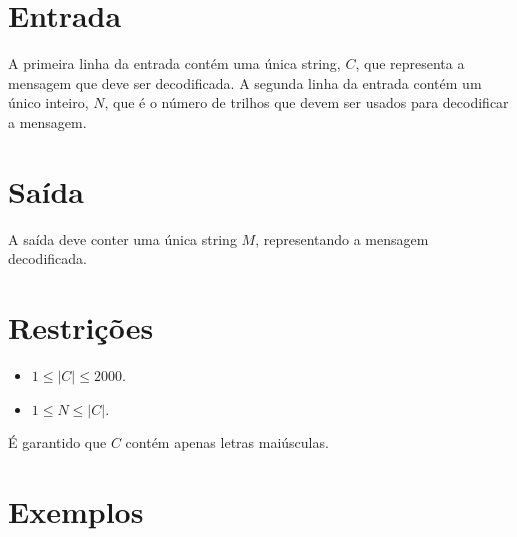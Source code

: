 \section*{Entrada}

A primeira linha da entrada contém uma única string, $C$, que representa a mensagem que deve ser decodificada. 
A segunda linha da entrada contém um único inteiro, $N$, que é o número de trilhos que devem ser usados para decodificar a mensagem.

\section*{Saída}

A saída deve conter uma única string $M$, representando a mensagem decodificada.

\section*{Restrições}

\begin{itemize}
\item $1 \leq |C| \leq 2000$.
\item $1 \leq N \leq |C|$.
\end{itemize}

É garantido que $C$ contém apenas letras maiúsculas.

\section*{Exemplos}

\exemplo
